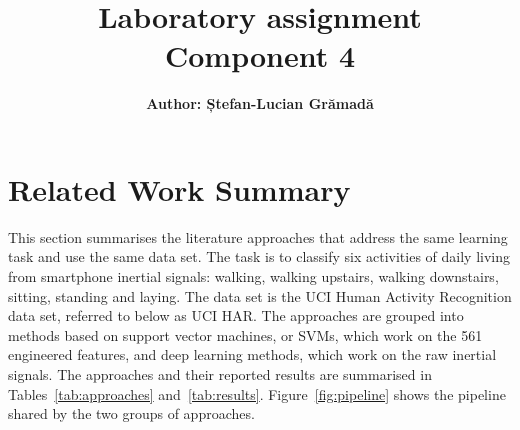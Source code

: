 \documentclass[a4paper, 11pt]{article}
\title{\textbf{Laboratory assignment} \\[1ex] \large \textbf{Component 4}}
\author{\textbf{Author: Ștefan-Lucian Grămadă}}
\begin{document}
\maketitle

\section{Related Work Summary}

This section summarises the literature approaches that address the same learning task and use the same data set. The task is to classify six activities of daily living from smartphone inertial signals: walking, walking upstairs, walking downstairs, sitting, standing and laying. The data set is the UCI Human Activity Recognition data set, referred to below as UCI HAR. The approaches are grouped into methods based on support vector machines, or SVMs, which work on the 561 engineered features, and deep learning methods, which work on the raw inertial signals. The approaches and their reported results are summarised in Tables~\ref{tab:approaches} and~\ref{tab:results}. Figure~\ref{fig:pipeline} shows the pipeline shared by the two groups of approaches.
\end{document}
